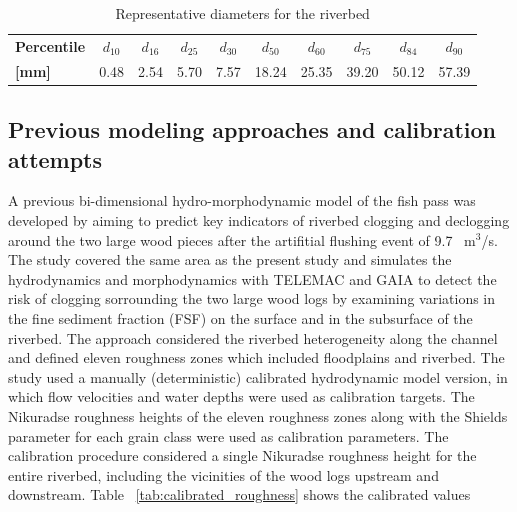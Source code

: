 \documentclass[draft,linenumbers,onecolumn]{agujournal2019} %
\begin{document}
\begin{table}[ht]
	\centering
	\caption{Representative diameters for the riverbed}
	\begin{tabular}{lccccccccc}
		\hline
		\textbf{Percentile} & \(d_{10}\) & \(d_{16}\) & \(d_{25}\) & \(d_{30}\) & \(d_{50}\) & \(d_{60}\) & \(d_{75}\) & \(d_{84}\) & \(d_{90}\) \\
		\textbf{[mm]}       & 0.48      & 2.54      & 5.70      & 7.57      & 18.24     & 25.35     & 39.20     & 50.12     & 57.39     \\
		\hline
	\end{tabular}
	\label{tab:rep_diameters}
\end{table}


\subsection{Previous modeling approaches and calibration attempts}
\label{sec:Sec2.4}

A previous bi-dimensional hydro-morphodynamic model of the fish pass was developed by aiming to predict key indicators of riverbed clogging and declogging around the two large wood pieces after the artifitial flushing event of 9.7 ~m$^3$/s. The study covered the same area as the present study and simulates the hydrodynamics and morphodynamics with TELEMAC and GAIA to detect the risk of clogging sorrounding the two large wood logs by examining variations in the fine sediment fraction (FSF) on the surface and in the subsurface of the riverbed.
The approach considered the riverbed heterogeneity along the channel and defined eleven roughness zones which included floodplains and riverbed. The study used a manually (deterministic) calibrated hydrodynamic model version, in which flow velocities and water depths were used as calibration targets. The Nikuradse roughness heights of the eleven roughness zones along with the Shields parameter for each grain class were used as calibration parameters. The calibration procedure considered a single Nikuradse roughness height for the entire riverbed, including the vicinities of the wood logs upstream and downstream. Table ~\ref{tab:calibrated_roughness} shows the calibrated values 
\end{document}
